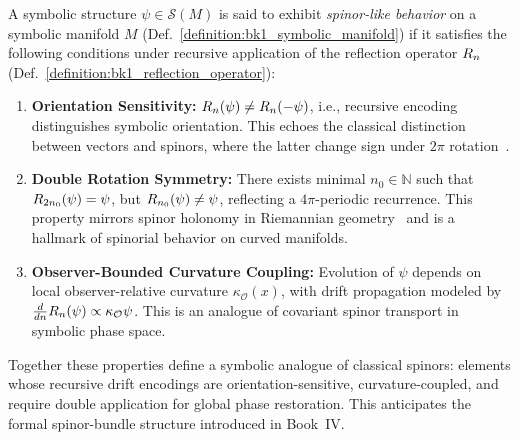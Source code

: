 \begin{definition}
\label{definition:bk1_spinor_like_structure}
A symbolic structure \( \psi \in \mathcal{S}(M) \) is said to exhibit \emph{spinor-like behavior} on a symbolic manifold \( M \) (Def.~\ref{definition:bk1_symbolic_manifold}) if it satisfies the following conditions under recursive application of the reflection operator \( R_n \) (Def.~\ref{definition:bk1_reflection_operator}):

\begin{enumerate}
    \item \textbf{Orientation Sensitivity:} \( R_n(\psi) \neq R_n(-\psi) \), i.e., recursive encoding distinguishes symbolic orientation. This echoes the classical distinction between vectors and spinors, where the latter change sign under \( 2\pi \) rotation~\cite{lawson_spin_geometry}.

    \item \textbf{Double Rotation Symmetry:} There exists minimal \( n_0 \in \mathbb{N} \) such that \( R_{2n_0}(\psi) = \psi \), but \( R_{n_0}(\psi) \neq \psi \), reflecting a \(4\pi\)-periodic recurrence. This property mirrors spinor holonomy in Riemannian geometry~\cite{friedrich_dirac} and is a hallmark of spinorial behavior on curved manifolds.

    \item \textbf{Observer-Bounded Curvature Coupling:}
    Evolution of \( \psi \) depends on local observer-relative curvature
    \( \kappa_{\mathcal{O}}(x) \), with drift propagation modeled by
    \( \frac{d}{dn}R_n(\psi) \propto \kappa_{\mathcal{O}}\psi \).
    This is an analogue of covariant spinor transport in symbolic phase space.
\end{enumerate}

Together these properties define a symbolic analogue of classical spinors:
elements whose recursive drift encodings are orientation-sensitive,
curvature-coupled, and require double application for global phase restoration.
This anticipates the formal spinor-bundle structure introduced in Book~IV.
\end{definition}
